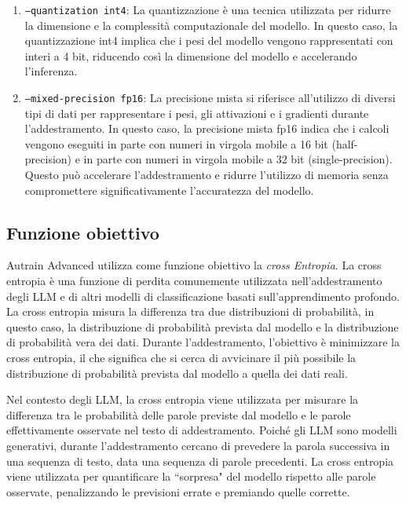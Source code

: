 \begin{enumerate}[label=\alph*.]
  \item \texttt{--quantization int4}: La quantizzazione è una tecnica utilizzata per ridurre la dimensione e la complessità computazionale del modello. In questo caso, la quantizzazione int4 implica che i pesi del modello vengono rappresentati con interi a 4 bit, riducendo così la dimensione del modello e accelerando l'inferenza.
  
  \item \texttt{--mixed-precision fp16}: La precisione mista si riferisce all'utilizzo di diversi tipi di dati per rappresentare i pesi, gli attivazioni e i gradienti durante l'addestramento. In questo caso, la precisione mista fp16 indica che i calcoli vengono eseguiti in parte con numeri in virgola mobile a 16 bit (half-precision) e in parte con numeri in virgola mobile a 32 bit (single-precision). Questo può accelerare l'addestramento e ridurre l'utilizzo di memoria senza compromettere significativamente l'accuratezza del modello.
\end{enumerate}




\subsection{Funzione obiettivo}\label{sec:loss_function}
Autrain Advanced utilizza come funzione obiettivo la \textit{cross Entropia}.
La cross entropia è una funzione di perdita comunemente utilizzata nell'addestramento degli LLM e di altri modelli di classificazione basati sull'apprendimento profondo. La cross entropia misura la differenza tra due distribuzioni di probabilità, in questo caso, la distribuzione di probabilità prevista dal modello e la distribuzione di probabilità vera dei dati. Durante l'addestramento, l'obiettivo è minimizzare la cross entropia, il che significa che si cerca di avvicinare il più possibile la distribuzione di probabilità prevista dal modello a quella dei dati reali.

Nel contesto degli LLM, la cross entropia viene utilizzata per misurare la differenza tra le probabilità delle parole previste dal modello e le parole effettivamente osservate nel testo di addestramento. Poiché gli LLM sono modelli generativi, durante l'addestramento cercano di prevedere la parola successiva in una sequenza di testo, data una sequenza di parole precedenti. La cross entropia viene utilizzata per quantificare la ``sorpresa" del modello rispetto alle parole osservate, penalizzando le previsioni errate e premiando quelle corrette.

